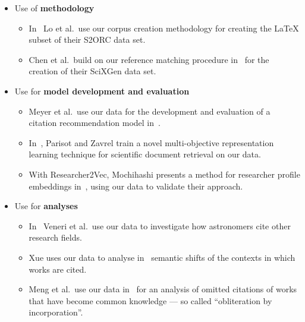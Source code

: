 \begin{itemize}
    \item Use of \textbf{methodology}
    \begin{itemize}
        \item In~\cite{Lo2020} Lo et al.\ use our corpus creation methodology for creating the \LaTeX{} subset of their S2ORC data set.
        \item Chen et al.\ build on our reference matching procedure in~\cite{chen2021-scixgen} for the creation of their SciXGen data set.
    \end{itemize}
    \item Use for \textbf{model development and evaluation}
    \begin{itemize}
        \item Meyer et al.\ use our data for the development and evaluation of a citation recommendation model in~\cite{Citcom2021}. %
        \item In~\cite{Parisot2022}, Parisot and Zavrel train a novel multi-objective representation learning technique for scientific document retrieval on our data.
        \item With Researcher2Vec, Mochihashi presents a method for researcher profile embeddings in~\cite{Mochihashi2023}, using our data to validate their approach.
    \end{itemize}
    \item Use for \textbf{analyses}
    \begin{itemize}
        \item In~\cite{Veneri2022} Veneri et al.\ use our data to investigate how astronomers cite other research fields.
        \item Xue uses our data to analyse in~\cite{Xue2021} semantic shifts of the contexts in which works are cited. %
        \item Meng et al.\ use our data in~\cite{Meng2023} for an analysis of omitted citations of works that have become common knowledge --- so called ``obliteration by incorporation''.
    \end{itemize}
\end{itemize}

